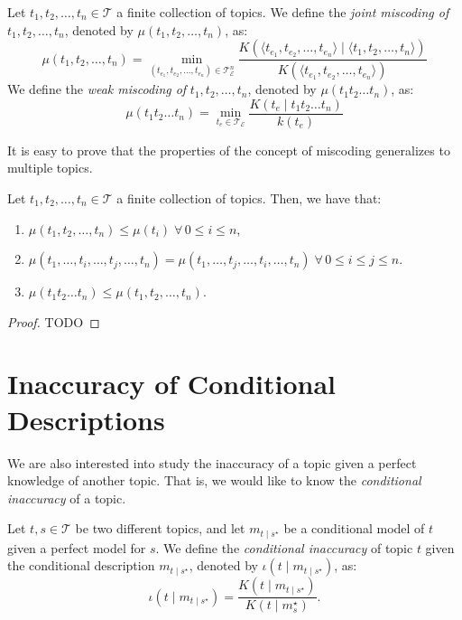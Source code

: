 \begin{definition}
Let $t_1, t_2, \ldots, t_n \in \mathcal{T}$ a finite collection of topics. We define the \emph{joint miscoding of} $t_1, t_2, \ldots, t_n$, denoted by $\mu(t_1, t_2, \ldots, t_n)$, as:
\[
\mu(t_1, t_2, \ldots, t_n) = \min_{(t_{e_1}, t_{e_2}, \ldots, t_{e_n}) \in \mathcal{T}_\mathcal{E}^n}  \frac{K \left( \langle t_{e_1}, t_{e_2}, \ldots, t_{e_n} \rangle \mid \langle t_1, t_2, \ldots, t_n \rangle \right) }{K \left( \langle t_{e_1}, t_{e_2}, \ldots, t_{e_n} \rangle \right)}
\]
We define the \emph{weak miscoding of} $t_1, t_2, \ldots, t_n$, denoted by $\mu(t_1 t_2 \ldots t_n)$, as:
\[
\mu(t_1 t_2 \ldots t_n) = \min_{t_e \in \mathcal{T}_\mathcal{E}} \frac{K(t_e \mid t_1 t_2 \ldots t_n)}{k(t_e)}
\]
\end{definition}

It is easy to prove that the properties of the concept of miscoding generalizes to multiple topics.

\begin{proposition}
Let $t_1, t_2, \ldots, t_n \in \mathcal{T}$ a finite collection of topics. Then, we have that:

\renewcommand{\theenumi}{\roman{enumi}}
\begin{enumerate}
\item $\mu(t_1, t_2, \ldots, t_n) \leq \mu(t_i) \; \forall \, 0 \leq i \leq n$,
\item $\mu(t_1, \ldots, t_i, \ldots, t_j, \ldots, t_n) = \mu(t_1, \ldots, t_j, \ldots, t_i, \ldots, t_n) \; \forall \, 0 \leq i \leq j \leq n$.
\item $\mu(t_1 t_2 \ldots t_n) \leq \mu(t_1, t_2, \ldots, t_n)$.
\end{enumerate}
\end{proposition}
\begin{proof}
{\color{red} TODO}
\end{proof}


%
%

\section{Inaccuracy of Conditional Descriptions}

We are also interested into study the inaccuracy of a topic given a perfect knowledge of another topic. That is, we would like to know the \emph{conditional inaccuracy} of a topic.

\begin{definition}
Let $t,s \in \mathcal{T}$ be two different topics, and let $m_{t \mid s^\star}$ be a conditional model of $t$ given a perfect model for $s$. We define the \emph{conditional inaccuracy} of topic $t$ given the conditional description $m_{t \mid s^\star}$, denoted by $\iota(t \mid m_{t \mid s^\star})$, as: 
\[
\iota( t \mid m_{t \mid s^\star}) = \frac{ K \left(t \mid m_{t \mid s^\star} \right) } {K(t \mid m^\star_s)}.
\]
\end{definition}

